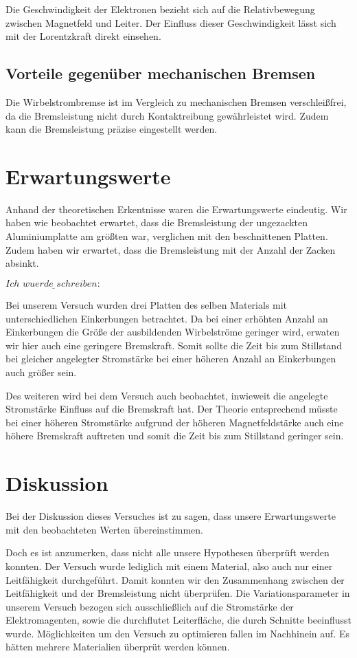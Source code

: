 Die Geschwindigkeit der Elektronen bezieht sich auf die
Relativbewegung zwischen Magnetfeld und Leiter. Der Einfluss dieser
Geschwindigkeit lässt sich mit der Lorentzkraft direkt einsehen.

\subsection{Vorteile gegenüber mechanischen Bremsen}

Die Wirbelstrombremse ist im Vergleich zu mechanischen Bremsen
verschleißfrei, da die Bremsleistung nicht durch Kontaktreibung
gewährleistet wird. Zudem kann die Bremsleistung präzise eingestellt
werden.

\section{Erwartungswerte}

Anhand der theoretischen Erkentnisse waren die Erwartungswerte eindeutig.
Wir haben wie beobachtet erwartet, dass die Bremsleistung der
ungezackten Aluminiumplatte am größten war, verglichen mit den
beschnittenen Platten.
Zudem haben wir erwartet, dass die Bremsleistung mit der Anzahl der
Zacken absinkt.

$\underline{Ich \,\, wuerde \,\, schreiben: }$

Bei unserem Versuch wurden drei Platten des selben Materials mit unterschiedlichen
Einkerbungen betrachtet. Da bei einer erhöhten Anzahl an Einkerbungen die Größe
der ausbildenden Wirbelströme geringer wird, erwaten wir hier auch eine geringere
Bremskraft. Somit sollte die Zeit bis zum Stillstand bei gleicher angelegter
Stromstärke bei einer höheren Anzahl an Einkerbungen auch größer sein.

Des weiteren wird bei dem Versuch auch beobachtet, inwieweit die angelegte
Stromstärke Einfluss auf die Bremskraft hat. Der Theorie entsprechend müsste
bei einer höheren Stromstärke aufgrund der höheren Magnetfeldstärke auch eine
höhere Bremskraft auftreten und somit die Zeit bis zum Stillstand geringer sein.

\section{Diskussion}

Bei der Diskussion dieses Versuches ist zu sagen, dass unsere Erwartungswerte
mit den beobachteten Werten übereinstimmen.

Doch es ist anzumerken, dass nicht alle unsere Hypothesen überprüft
werden konnten. Der Versuch wurde lediglich mit einem Material, also auch nur einer
Leitfähigkeit durchgeführt. Damit konnten wir den Zusammenhang
zwischen der Leitfähigkeit und der Bremsleistung nicht überprüfen.
Die Variationsparameter in unserem Versuch bezogen sich
ausschließlich auf die Stromstärke der Elektromagenten, sowie
die durchflutet Leiterfläche, die durch Schnitte beeinflusst wurde.
Möglichkeiten um den Versuch zu optimieren fallen im Nachhinein auf.
Es hätten mehrere Materialien überprüt werden können.

